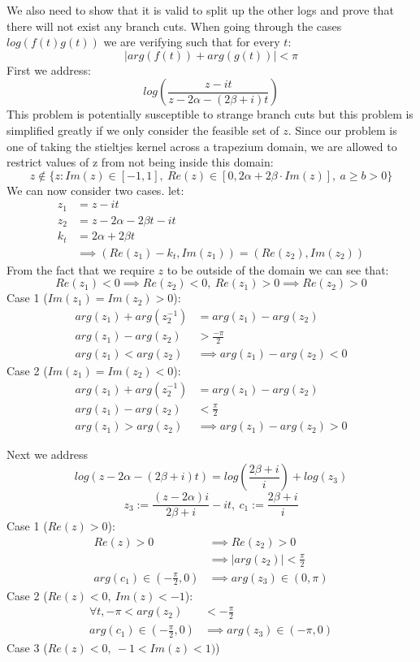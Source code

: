 \documentclass{article}
\begin{document}
We also need to show that it is valid to split up the other logs and prove that there will not exist any branch cuts.
When going through the cases $log(f(t)g(t))$ we are verifying such that for every $t$:
$$|arg(f(t))+arg(g(t))|<\pi$$
First we address:
$$log(\frac{z-it}{z-2\alpha-(2\beta+i)t})$$
This problem is potentially susceptible to strange branch cuts but this problem is simplified greatly if we only consider the feasible set of $z$.
Since our problem is one of taking the stieltjes kernel across a trapezium domain, we are allowed to restrict values of z from not being inside this domain:
$$z\notin \{z: Im(z)\in [-1,1],\:Re(z)\in [0,2\alpha+2\beta\cdot Im(z)],\:a\geq b>0\}$$
We can now consider two cases.
let:
\begin{align}
    z_1&=z-it\\
    z_2&=z-2\alpha-2\beta t-it\\
    k_t&=2\alpha+2\beta t\\
    &\implies (Re(z_1)-k_t, Im(z_1))=(Re(z_2), Im(z_2))
\end{align}
From the fact that we require $z$ to be outside of the domain we can see that:
$$Re(z_1)<0 \implies Re(z_2)<0,\: Re(z_1)>0 \implies Re(z_2)>0$$
Case 1 ($Im(z_1)=Im(z_2)>0$):
\begin{align}
    arg(z_1)+arg(z_2^{-1})&=arg(z_1)-arg(z_2)\\
    arg(z_1)-arg(z_2)&>\frac{-\pi}{2}\\
    arg(z_1)<arg(z_2)&\implies arg(z_1)-arg(z_2)<0
\end{align}
Case 2 ($Im(z_1)=Im(z_2)<0$):
\begin{align}
    arg(z_1)+arg(z_2^{-1})&=arg(z_1)-arg(z_2)\\
    arg(z_1)-arg(z_2)&<\frac{\pi}{2}\\
    arg(z_1)>arg(z_2)&\implies arg(z_1)-arg(z_2)>0
\end{align}

Next we address
$$log(z-2\alpha-(2\beta+i)t)=log(\frac{2\beta+i}{i})+log(z_3)$$
$$z_3:=\frac{(z-2\alpha)i}{2\beta+i}-it,\:c_1:=\frac{2\beta+i}{i}$$
Case 1 ($Re(z)>0$):
\begin{align}
    Re(z)>0&\implies Re(z_2)>0\\
    &\implies |arg(z_2)|<\frac{\pi}{2}\\
    arg(c_1)\in(-\frac{\pi}{2},0)&\implies arg(z_3)\in(0,\pi)
\end{align}
Case 2 ($Re(z)<0,\:Im(z)<-1$):
\begin{align}
    \forall t, -\pi<arg(z_2)&<-\frac{\pi}{2}\\
    arg(c_1)\in(-\frac{\pi}{2},0)&\implies arg(z_3)\in(-\pi,0)
\end{align}
Case 3 ($Re(z)<0,\:-1<Im(z)<1)$)
\end{document}
